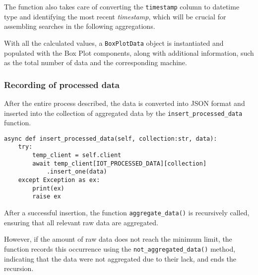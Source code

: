 The function also takes care of converting the \texttt{timestamp} column to datetime type and identifying the most recent \textit{timestamp}, which will be crucial for assembling searches in the following aggregations.

With all the calculated values, a \texttt{BoxPlotData} object is instantiated and populated with the Box Plot components, along with additional information, such as the total number of data and the corresponding machine.


\subsubsection{Recording of processed data}
After the entire process described, the data is converted into JSON format and inserted into the collection of aggregated data by the \texttt{insert\_processed\_data} function.

\begin{verbatim}
async def insert_processed_data(self, collection:str, data):
    try:
        temp_client = self.client
        await temp_client[IOT_PROCESSED_DATA][collection]
            .insert_one(data)
    except Exception as ex:
        print(ex)
        raise ex
\end{verbatim}

After a successful insertion, the function \texttt{aggregate\_data()} is recursively called, ensuring that all relevant raw data are aggregated.

However, if the amount of raw data does not reach the minimum limit, the function records this occurrence using the \texttt{not\_aggregated\_data()} method, indicating that the data were not aggregated due to their lack, and ends the recursion.